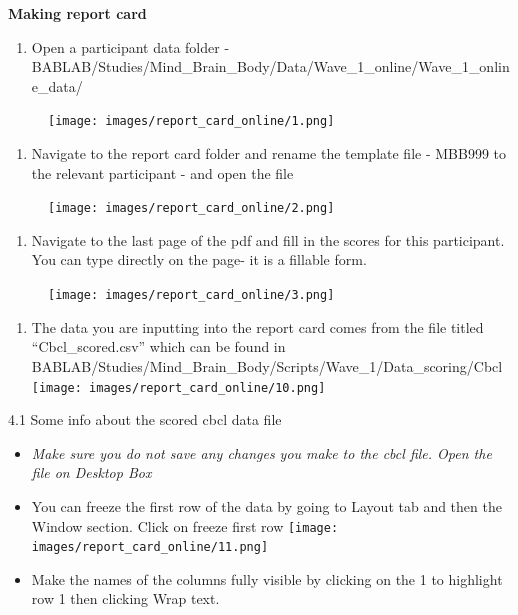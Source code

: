 \documentclass[
]{book}
\providecommand{\tightlist}{%
  \setlength{\itemsep}{0pt}\setlength{\parskip}{0pt}}
\begin{document}
\textbf{Making report card}

\begin{enumerate}
\def\labelenumi{\arabic{enumi}.}
\tightlist
\item
  Open a participant data folder - BABLAB/Studies/Mind\_Brain\_Body/Data/Wave\_1\_online/Wave\_1\_online\_data/
\end{enumerate}

\begin{figure}
\centering
\texttt{[image: images/report\_card\_online/1.png]}
\caption{}
\end{figure}

\begin{enumerate}
\def\labelenumi{\arabic{enumi}.}
\setcounter{enumi}{1}
\tightlist
\item
  Navigate to the report card folder and rename the template file - MBB999 to the relevant participant - and open the file
\end{enumerate}

\begin{figure}
\centering
\texttt{[image: images/report\_card\_online/2.png]}
\caption{}
\end{figure}

\begin{enumerate}
\def\labelenumi{\arabic{enumi}.}
\setcounter{enumi}{2}
\tightlist
\item
  Navigate to the last page of the pdf and fill in the scores for this participant. You can type directly on the page- it is a fillable form.
\end{enumerate}

\begin{figure}
\centering
\texttt{[image: images/report\_card\_online/3.png]}
\caption{}
\end{figure}

\begin{enumerate}
\def\labelenumi{\arabic{enumi}.}
\setcounter{enumi}{3}
\tightlist
\item
  The data you are inputting into the report card comes from the file titled ``Cbcl\_scored.csv'' which can be found in BABLAB/Studies/Mind\_Brain\_Body/Scripts/Wave\_1/Data\_scoring/Cbcl
  \texttt{[image: images/report\_card\_online/10.png]}
\end{enumerate}

4.1 Some info about the scored cbcl data file

\begin{itemize}
\item
  \emph{Make sure you do not save any changes you make to the cbcl file. Open the file on Desktop Box}
\item
  You can freeze the first row of the data by going to Layout tab and then the Window section. Click on freeze first row
  \texttt{[image: images/report\_card\_online/11.png]}
\item
  Make the names of the columns fully visible by clicking on the 1 to highlight row 1 then clicking Wrap text.
\end{itemize}
\end{document}
